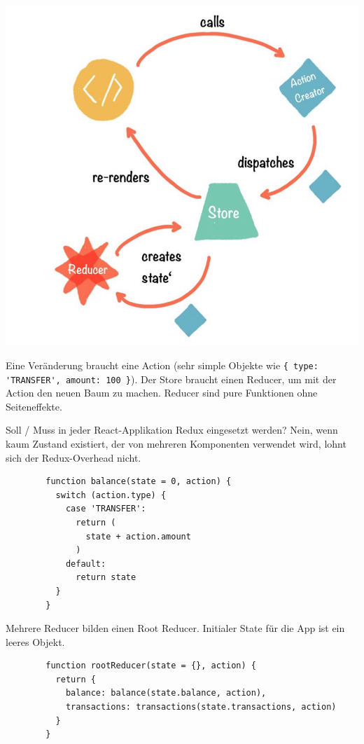 \documentclass[10pt,landscape]{article}
\begin{document}
\begin{multicols}{3}
        \includegraphics[width=\linewidth]{redux_data_flow}

        Eine Veränderung braucht eine Action (sehr simple Objekte wie \lstinline!{ type: 'TRANSFER', amount: 100 }!).
        Der Store braucht einen Reducer, um mit der Action den neuen Baum zu machen.
        Reducer sind pure Funktionen ohne Seiteneffekte.

        Soll / Muss in jeder React-Applikation Redux eingesetzt werden?
        Nein, wenn kaum Zustand existiert, der von mehreren Komponenten verwendet wird, lohnt sich der Redux-Overhead nicht.

        \begin{lstlisting}
        function balance(state = 0, action) {
          switch (action.type) {
            case 'TRANSFER':
              return (
                state + action.amount
              )
            default:
              return state
          }
        }
        \end{lstlisting}

        Mehrere Reducer bilden einen Root Reducer.
        Initialer State für die App ist ein leeres Objekt.

        \begin{lstlisting}
        function rootReducer(state = {}, action) {
          return {
            balance: balance(state.balance, action),
            transactions: transactions(state.transactions, action)
          }
        }


\end{lstlisting}
\end{multicols}
\end{document}
